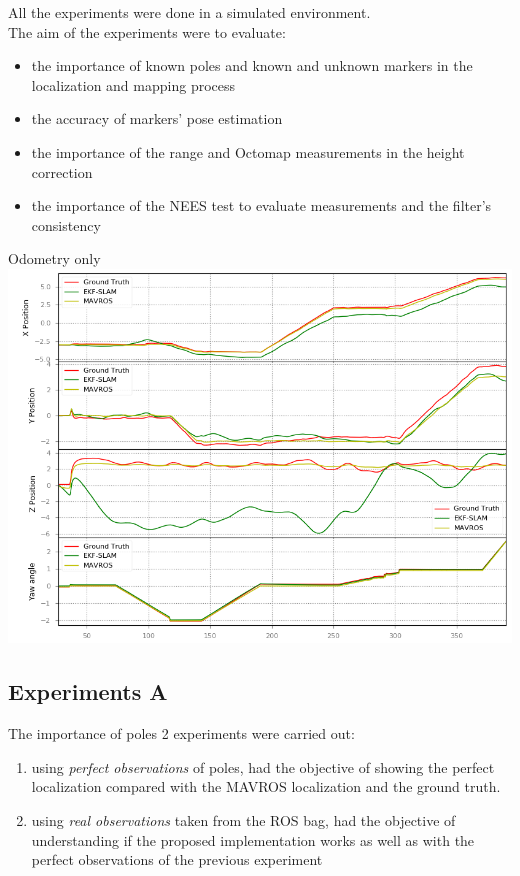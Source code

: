 \documentclass[serif]{beamer}
\begin{document}
    \begin{frame}
        All the experiments were done in a simulated environment.\\
        The aim of the experiments were to evaluate:
        \begin{itemize}
            \item{the importance of known poles and known and unknown markers in the localization and mapping process}
            \item{the accuracy of markers' pose estimation}
            \item{the importance of the range and Octomap measurements in the height correction}
            \item{the importance of the NEES test to evaluate measurements and the filter's consistency}
        \end{itemize}
    \end{frame}
    \begin{frame}{Odometry only}
        \centering
        \includegraphics[width=0.8\linewidth]{Images/fig19-odom_only.png}
    \end{frame}

    \subsection{Experiments A}
    \begin{frame}[nonumber]{The importance of poles}
        2 experiments were carried out:
        \begin{enumerate}
            \item{using \emph{perfect observations} of poles, had the objective of showing the perfect localization compared with the MAVROS localization and the ground truth.}
            \item{using \emph{real observations} taken from the ROS bag, had the objective of understanding if the proposed implementation works as well as with the perfect observations of the previous experiment}
        \end{enumerate}
    \end{frame}
\end{document}

